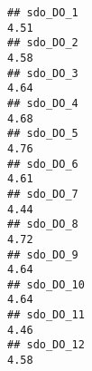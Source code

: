 \documentclass[
]{article}
\begin{document}
\begin{verbatim}
## sdo_DO_1                                                                                                                                                                                                                      4.51
## sdo_DO_2                                                                                                                                                                                                                      4.58
## sdo_DO_3                                                                                                                                                                                                                      4.64
## sdo_DO_4                                                                                                                                                                                                                      4.68
## sdo_DO_5                                                                                                                                                                                                                      4.76
## sdo_DO_6                                                                                                                                                                                                                      4.61
## sdo_DO_7                                                                                                                                                                                                                      4.44
## sdo_DO_8                                                                                                                                                                                                                      4.72
## sdo_DO_9                                                                                                                                                                                                                      4.64
## sdo_DO_10                                                                                                                                                                                                                     4.64
## sdo_DO_11                                                                                                                                                                                                                     4.46
## sdo_DO_12                                                                                                                                                                                                                     4.58

\end{verbatim}
\end{document}
